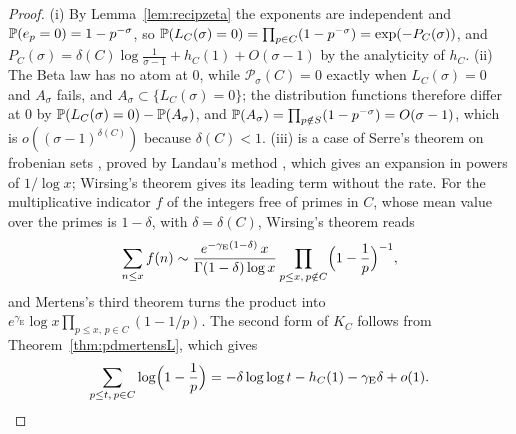\begin{proof}
(i) By Lemma~\ref{lem:recipzeta} the exponents are independent and $\mathbb{P}(e_p=0)=1-p^{-\sigma}$, so $\mathbb{P}(L_C(\sigma)=0)=\prod_{p\in C}(1-p^{-\sigma})=\exp(-P_C(\sigma))$, and $P_C(\sigma)=\delta(C)\log\frac1{\sigma-1}+h_C(1)+O(\sigma-1)$ by the analyticity of $h_C$. (ii) The Beta law has no atom at $0$, while $\mathcal P_\sigma(C)=0$ exactly when $L_C(\sigma)=0$ and $A_\sigma$ fails, and $A_\sigma\subset\{L_C(\sigma)=0\}$; the distribution functions therefore differ at $0$ by $\mathbb{P}(L_C(\sigma)=0)-\mathbb{P}(A_\sigma)$, and $\mathbb{P}(A_\sigma)=\prod_{p\notin S}(1-p^{-\sigma})=O(\sigma-1)$, which is $o((\sigma-1)^{\delta(C)})$ because $\delta(C)<1$. (iii) is a case of Serre's theorem on frobenian sets \cite{serre1976}, proved by Landau's method \cite{landau1908}, which gives an expansion in powers of $1/\log x$; Wirsing's theorem \cite{wirsing1961} gives its leading term without the rate. For the multiplicative indicator $f$ of the integers free of primes in $C$, whose mean value over the primes is $1-\delta$, with $\delta=\delta(C)$, Wirsing's theorem reads
\[
\sum_{n\le x}f(n)\sim\frac{e^{-\gamma_{\mathrm E}(1-\delta)}\,x}{\Gamma(1-\delta)\log x}\prod_{p\le x,\,p\notin C}\Bigl(1-\frac1p\Bigr)^{-1},
\]
and Mertens's third theorem turns the product into $e^{\gamma_{\mathrm E}}\log x\prod_{p\le x,\,p\in C}(1-1/p)$. The second form of $K_C$ follows from Theorem~\ref{thm:pdmertensL}, which gives
\[
\sum_{p\le t,\,p\in C}\log\Bigl(1-\frac1p\Bigr)=-\delta\log\log t-h_C(1)-\gamma_{\mathrm E}\delta+o(1).\qedhere
\]
\end{proof}

